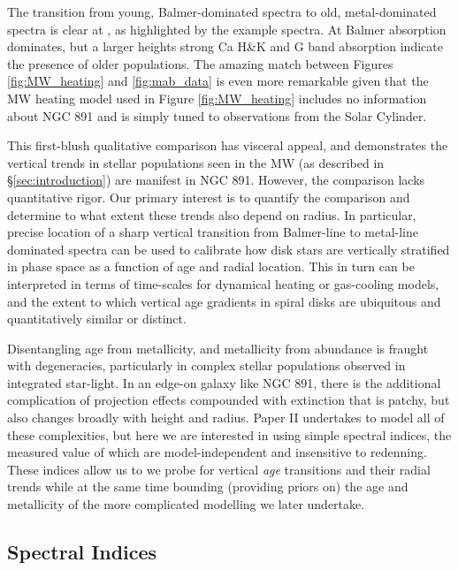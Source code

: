 
The transition from young, Balmer-dominated spectra to
old, metal-dominated spectra is clear at , as
highlighted by the example spectra. At  Balmer
absorption dominates, but a larger heights strong Ca H\&K and G band
absorption indicate the presence of older populations.  The amazing
match between Figures \ref{fig:MW_heating} and \ref{fig:mab_data} is
even more remarkable given that the MW heating model used in Figure
\ref{fig:MW_heating} includes no information about NGC 891 and is
simply tuned to observations from the Solar Cylinder.

This first-blush qualitative comparison has visceral appeal, and
demonstrates the vertical trends in stellar populations seen in the MW
(as described in \S\ref{sec:introduction}) are manifest in NGC
891. However, the comparison lacks quantitative rigor.  Our primary
interest is to quantify the comparison and determine to what extent
these trends also depend on radius. In particular, precise location of
a sharp vertical transition from Balmer-line to metal-line dominated
spectra can be used to calibrate how disk stars are vertically
stratified in phase space as a function of age and radial
location. This in turn can be interpreted in terms of time-scales for
dynamical heating or gas-cooling models, and the extent to which
vertical age gradients in spiral disks are ubiquitous and
quantitatively similar or distinct.

Disentangling age from metallicity, and metallicity from abundance is
fraught with degeneracies, particularly in complex stellar populations
observed in integrated star-light. In an edge-on galaxy like NGC 891,
there is the additional complication of projection effects compounded
with extinction that is patchy, but also changes broadly with height
and radius. Paper II undertakes to model all of these complexities,
but here we are interested in using simple spectral indices, the
measured value of which are model-independent and insensitive to
redenning. These indices allow us to we probe for vertical {\it age}
transitions and their radial trends while at the same time bounding
(providing priors on) the age and metallicity of the more complicated
modelling we later undertake.

\subsection{Spectral Indices}
\label{sec:indices}

